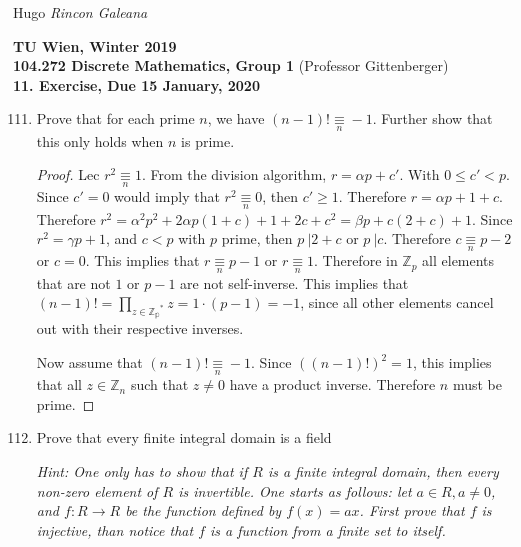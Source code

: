 \documentclass[12pt]{article}
\newcommand{\Term}{Winter 2019}
\newcommand{\Course}{104.272 Discrete Mathematics, Group 1}
\newcommand{\Assignment}{11. Exercise}
\newcommand{\DueDate}{ 15 January, 2020 }
\begin{document}
Hugo \textit{Rincon Galeana}
\begin{center}

\textbf{TU Wien, \Term} \\
\textbf{\Course} (Professor Gittenberger) \\
\textbf{\Assignment, Due \DueDate}
\end{center}


\begin{enumerate}
\setcounter{enumi}{110}
    \item Prove that for each prime $n$, we have $(n-1)! \underset{n}{\equiv} -1 $. Further show that this only holds when $n$ is prime.
    
    \begin{proof}
     Lec $r^2 \underset{n}{ \equiv} 1$. From the division algorithm, $r = \alpha p + c'$. With $0 \leq c' < p$. Since $c'= 0$ would imply that $r^2 \underset{n}{\equiv} 0$, then $c' \geq 1$. Therefore $r = \alpha p + 1 + c$. Therefore $r^2 = \alpha^2 p^2 +2 \alpha p (1+c) +1 +2c + c ^2 = \beta p + c (2+c) + 1$. Since $r^2 = \gamma p + 1$, and $c < p$ with $p$ prime, then $p \: | 2+c$ or $p \: | c$. Therefore $c  \underset{n}{\equiv} p-2$ or $c = 0$. This implies that $r \underset{n}{\equiv} p-1$ or $r \underset{n}{\equiv} 1$. Therefore in $\mathbb{Z}_p$ all elements that are not $1$ or $p-1$ are not self-inverse. This implies that $(n-1)! = \prod \limits _{z \in \mathbb{Z_p}^*} z = 1 \cdot (p-1) = -1$, since all other elements cancel out with their respective inverses.
     
     Now assume that $(n-1)! \underset{n}{\equiv} -1$. Since $((n-1)!)^2 = 1$, this implies that all $z \in \mathbb{Z}_n$ such that $z \neq 0$ have a product inverse. Therefore $n$ must be prime.
    \end{proof}
    
    \item Prove that every finite integral domain is a field
    
    \emph{Hint: One only has to show that if $R$ is a finite integral domain, then every non-zero element of $R$ is invertible. One starts as follows: let $a \in R, a \neq 0$, and $f: R \rightarrow R$ be the function defined by $f(x) = ax$. First prove that $f$ is injective, than notice that $f$ is a function from a finite set to itself.}
    

\end{enumerate}
\end{document}
